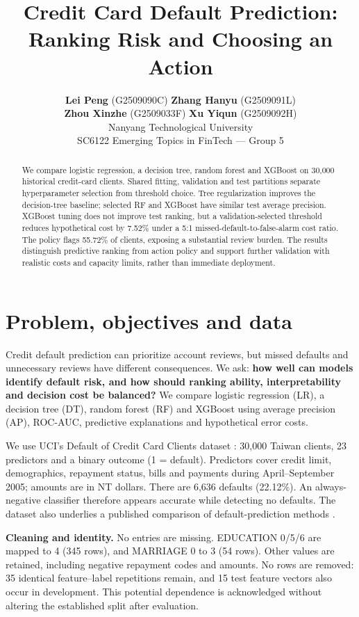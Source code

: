 \documentclass{article}
\title{Credit Card Default Prediction:\\Ranking Risk and Choosing an Action}
\author{ \textbf{Lei Peng} (G2509090C) \quad \textbf{Zhang Hanyu} (G2509091L) \\ \textbf{Zhou Xinzhe} (G2509033F) \quad \textbf{Xu Yiqun} (G2509092H) \\ Nanyang Technological University \\ SC6122 Emerging Topics in FinTech --- Group 5 }
\begin{document}
\maketitle
\thispagestyle{plain}
\begin{abstract}
We compare logistic regression, a decision tree, random forest and XGBoost on 30,000 historical credit-card clients. Shared fitting, validation and test partitions separate hyperparameter selection from threshold choice. Tree regularization improves the decision-tree baseline; selected RF and XGBoost have similar test average precision. XGBoost tuning does not improve test ranking, but a validation-selected threshold reduces hypothetical cost by 7.52\% under a 5:1 missed-default-to-false-alarm cost ratio. The policy flags 55.72\% of clients, exposing a substantial review burden. The results distinguish predictive ranking from action policy and support further validation with realistic costs and capacity limits, rather than immediate deployment.
\end{abstract}
\section{Problem, objectives and data}
Credit default prediction can prioritize account reviews, but missed defaults and unnecessary reviews have different consequences. We ask: \textbf{how well can models identify default risk, and how should ranking ability, interpretability and decision cost be balanced?} We compare logistic regression (LR), a decision tree (DT), random forest (RF) and XGBoost using average precision (AP), ROC-AUC, predictive explanations and hypothetical error costs.

We use UCI's Default of Credit Card Clients dataset \citep{uci}: 30,000 Taiwan clients, 23 predictors and a binary outcome (1 = default). Predictors cover credit limit, demographics, repayment status, bills and payments during April--September 2005; amounts are in NT dollars. There are 6,636 defaults (22.12\%). An always-negative classifier therefore appears accurate while detecting no defaults. The dataset also underlies a published comparison of default-prediction methods \citep{yeh}.

\textbf{Cleaning and identity.} No entries are missing. EDUCATION 0/5/6 are mapped to 4 (345 rows), and MARRIAGE 0 to 3 (54 rows). Other values are retained, including negative repayment codes and amounts. No rows are removed: 35 identical feature--label repetitions remain, and 15 test feature vectors also occur in development. This potential dependence is acknowledged without altering the established split after evaluation.
\end{document}
